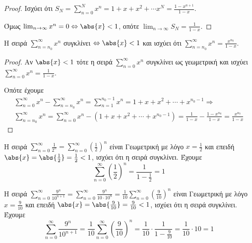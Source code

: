 \documentclass[main.tex]{subfiles}
\begin{document}
\begin{proof}
\item {}
    Ισχύει ότι $ S_{N} = \sum_{n=0}^{N} x^{n} =  1 + x + x^{2} + \cdots x^{N} = 
    \frac{1- x^{n+1}}{1-x} $.

    Όμως $ \lim_{n \to \infty} x^{n} = 0 \Leftrightarrow \abs{x} < 1 $, οπότε 
    $ \lim_{n \to \infty} S_{N} = \frac{1}{1-x} $.
\end{proof}

\begin{cor}
    Η σειρά $ \sum_{n= n_{0}}^{\infty} x^{n} $ συγκλίνει $ \Leftrightarrow \abs{x} <1 $
    και ισχύει ότι $ \sum_{n= n_{0}}^{\infty} x^{n} = \frac{x^{n_{0}}}{1-x} $.
\end{cor}
\begin{proof}
\item {}
    Αν $ \abs{x} < 1 $ τότε η σειρά $ \sum_{n=0}^{\infty} x^{n} $ συγκλίνει ως 
    γεωμετρική και ισχύει $ \sum_{n=0}^{\infty} x^{n} = \frac{1}{1-x} $. 

    Οπότε έχουμε
    \begin{align*}
        \sum_{n=0}^{\infty} x^{n} - \sum_{n= n_{0}}^{\infty} x^{n} = 
        \sum_{n= 1}^{n_{0} -1} x^{n} = 1 + x + x^{2} + \cdots + x^{n_{0}-1} 
        \Rightarrow \\
        \sum_{n= n_{0}}^{\infty} x^{n} = \sum_{n=0}^{\infty} x^{n} - (1 + x + x^{2} + 
        \cdots + x^{n_{0}-1}) = \frac{1}{1-x} - \frac{1- x^{n_{0}}}{1-x} = 
        \frac{x^{n_{0}}}{1-x}  
    \end{align*} 
\end{proof}

\begin{examples}
\item Η σειρά $ \sum_{n=0}^{\infty} \frac{1}{2^{n}} = \sum_{n=0}^{\infty} 
    {\left(\frac{1}{2} \right)}^{n} $ είναι Γεωμετρική με λόγο $ x = \frac{1}{2} $ 
    και επειδή 
    $ \abs{x} = \abs{\frac{1}{2}} = \frac{1}{2} < 1  $, ισχύει ότι η σειρά συγκλίνει.
    Έχουμε
    \[
        \sum_{n=0}^{\infty} {\left(\frac{1}{2} \right)}^{n} = 
        \frac{1}{1 - \frac{1}{2}} = 1
    \] 

\item Η σειρά $ \sum_{n=0}^{\infty} \frac{9^{n}}{10^{n+1}} = 
    \sum_{n=0}^{\infty} \frac{9^{n}}{10 \cdot 10^{n}} = 
    \frac{1}{10} \sum_{n=0}^{\infty} {\left(\frac{9}{10} \right)}^{n} $ είναι
    Γεωμετρική με λόγο $ x = \frac{9}{10} $ και επειδή $ \abs{x} = 
    \abs{\frac{9}{10}} = \frac{9}{10} < 1$, ισχύει ότι η σειρά συγκλίνει.
    Έχουμε 
    \[
        \sum_{n=0}^{\infty}  \frac{9^{n}}{10^{n+1}} = 
        \frac{1}{10} \sum_{n=0}^{\infty} {\left(\frac{9}{10} \right)}^{n} = 
        \frac{1}{10} \cdot \frac{1}{1 - \frac{9}{10}} = \frac{1}{10} \cdot 10 = 1
    \]
\end{examples}
\end{document}
